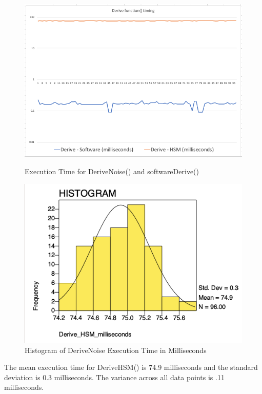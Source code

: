 \documentclass [11pt, proquest] {uwthesis}[2020/02/24]
\begin{document}
\begin{figure}[H]
\centering
\begin{minipage}{.5\textwidth}
  \centering
  \includegraphics[width=1\linewidth]{paper/images/deriveFunctiongraph.png}
  \caption{Execution Time for DeriveNoise() and softwareDerive()}
  \label{fig:funcTimeGraph}
\end{minipage}%
\begin{minipage}{.5\textwidth}
  \centering
  \includegraphics[width=1\linewidth]{paper/images/DeriveNoise freq.png}
  \caption{Histogram of DeriveNoise Execution Time in Milliseconds}
  \label{fig:hsmTimeGraph}
\end{minipage}
\end{figure}

The mean execution time for DeriveHSM() is 74.9 milliseconds and the standard deviation is 0.3 milliseconds. The variance across all data points is .11 milliseconds. 
\end{document}
